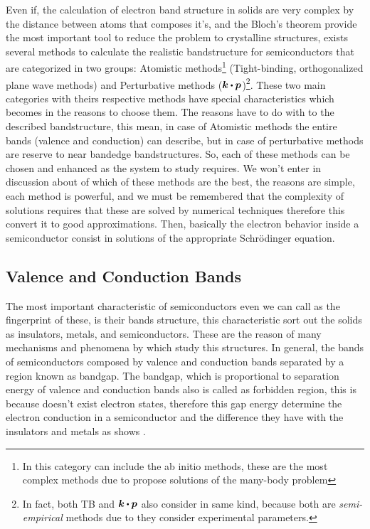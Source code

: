 Even if, the calculation of electron band structure in solids are very complex by the distance between atoms that composes it's, and the Bloch's theorem provide the most important tool to reduce the problem to crystalline structures, exists several methods to  calculate the realistic bandstructure for semiconductors that are categorized in two groups: Atomistic methods\footnote{In this category can include the ab initio methods, these are the most complex methods due to propose  solutions of the many-body problem} (Tight-binding, orthogonalized plane wave methods) and Perturbative methods ($\boldsymbol{k}\bigcdot \boldsymbol{p}$)\footnote{In fact, both TB and $\boldsymbol{k}\bigcdot \boldsymbol{p}$ also consider in same kind, because both are \emph{semi-empirical} methods due to they consider experimental parameters.}. 
These two main categories with theirs respective methods have special characteristics which becomes in the reasons to choose them. The reasons have to do with to the described bandstructure, this mean, in case of Atomistic methods the entire bands  (valence and conduction) can describe, but in case of perturbative methods are reserve to near bandedge bandstructures. So, each of these methods can be chosen and enhanced as the system to study requires. 
We won't enter  in discussion about of which of these methods are the best, the reasons are simple, each method is powerful, and we must be remembered that the complexity of solutions requires that these are solved by numerical techniques therefore this convert it to good approximations. 
Then, basically the electron behavior inside a semiconductor consist in solutions of the appropriate Schrödinger equation\cite{boer2018semiconductor}.  
\subsection{Valence and Conduction Bands}
\label{subsec:chapter-1-valence-and-conduction-bands}
\vspace{-10mm}
The most important characteristic of semiconductors even we can call as the fingerprint of these, is their bands structure, this characteristic sort out the solids as insulators, metals, and semiconductors. 
These are the reason of many mechanisms and phenomena by which study this structures. In general,  the bands of semiconductors composed by valence and conduction bands separated by a  region known as bandgap. 
The bandgap, which is proportional to separation energy of valence and conduction bands also is called as forbidden region, this is because doesn't exist electron states, therefore this gap energy determine the electron conduction in a semiconductor and the difference they have with the insulators and metals as shows .  

